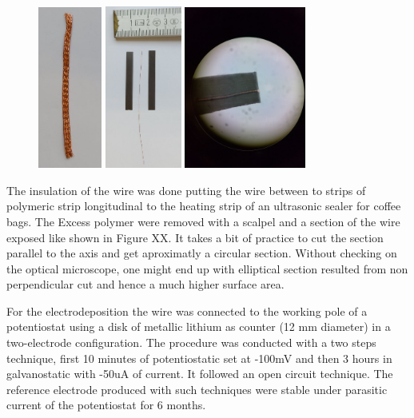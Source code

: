 \begin{figure}
    \includegraphics[width=2.1cm]{figures/application3/image5.1.jpg}
    \includegraphics[width=2.5cm]{figures/application3/image5.2.jpg}
    \includegraphics[width=4cm]{figures/application3/image5.3.jpg}
\end{figure}

The insulation of the wire was done putting the wire between to strips of polymeric strip longitudinal to the heating strip of an ultrasonic sealer for coffee bags. The Excess polymer were removed with a scalpel and a section of the wire exposed like shown in Figure XX. It takes a bit of practice to cut the section parallel to the axis and get aproximatly a circular section. Without checking on the optical microscope, one might end up with elliptical section resulted from non perpendicular cut and hence a much higher surface area.

For the electrodeposition the wire was connected to the working pole of a potentiostat using a disk of metallic lithium as counter (12 mm diameter) in a two-electrode configuration. The procedure was conducted with a two steps technique, first 10 minutes of potentiostatic set at -100mV and then 3 hours in galvanostatic with -50uA of current. It followed an open circuit technique. The reference electrode produced with such techniques were stable under parasitic  current of the potentiostat for 6 months.

